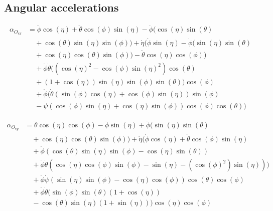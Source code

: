 \documentclass[letterpaper, 10 pt, conference]{ieeeconf}  %
\begin{document}
\subsection*{Angular accelerations}
\begin{equation}
  \begin{aligned}
    \alpha_{O_{ex}} & = \ddot{\phi}\cos(\eta) + \ddot{\theta}\cos(\phi)\sin(\eta) - \ddot{\phi}(\cos(\eta)\sin(\theta)                 \\
                    & \quad  + \cos(\theta)\sin(\eta)\sin(\phi)) + \dot{\eta}(\dot{\phi}\sin(\eta) - \dot{\phi}(\sin(\eta)\sin(\theta) \\
                    & \quad  +  \cos(\eta)\cos(\theta)\sin(\phi)) - \dot{\theta}\cos(\eta)\cos(\phi))                                  \\
                    & \quad + \dot{\phi}\dot{\theta}((\cos(\eta)^2 - \cos(\phi)\sin(\eta)^2)\cos(\theta)                               \\
                    & \quad  + (1 + \cos(\eta))\sin(\eta)\sin(\phi)\sin(\theta))\cos(\phi)                                             \\
                    & \quad + \dot{\phi}(\dot{\theta}(\sin(\phi)\cos(\eta) + \cos(\phi)\sin(\eta))\sin(\phi)                           \\
                    & \quad  - \dot{\psi}(\cos(\phi)\sin(\eta) + \cos(\eta)\sin(\phi))\cos(\phi)\cos(\theta))
  \end{aligned}
\end{equation}

\begin{equation}
  \begin{aligned}
    \alpha_{O_{ey}} & = \ddot{\theta}\cos(\eta)\cos(\phi) - \ddot{\phi}\sin(\eta) + \ddot{\phi}(\sin(\eta)\sin(\theta)                \\
                    & \quad  + \cos(\eta)\cos(\theta)\sin(\phi)) + \dot{\eta}(\dot{\phi}\cos(\eta) + \dot{\theta}\cos(\phi)\sin(\eta) \\
                    & \quad  + \dot{\phi}(\cos(\theta)\sin(\eta)\sin(\phi) - \cos(\eta)\sin(\theta))                                  \\
                    & \quad  + \dot{\phi}\dot{\theta}(\cos(\eta)\cos(\phi)\sin(\phi) - \sin(\eta)  - (\cos(\phi)^2)\sin(\eta)))       \\
                    & \quad + \dot{\phi}\dot{\psi}(\sin(\eta)\sin(\phi) - \cos(\eta)\cos(\phi))\cos(\theta)\cos(\phi)                 \\
                    & \quad + \dot{\phi}\dot{\theta}(\sin(\phi)\sin(\theta)(1 + \cos(\eta))                                           \\
                    & \quad - \cos(\theta)\sin(\eta)(1 + \sin(\eta)))\cos(\eta)\cos(\phi)
  \end{aligned}
\end{equation}
\end{document}
